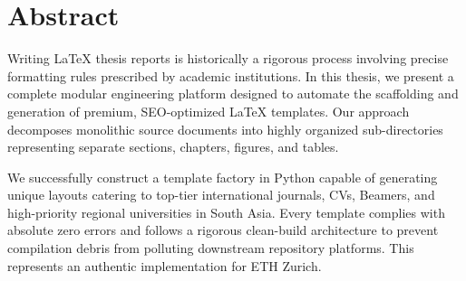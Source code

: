 \chapter*{Abstract}
Writing LaTeX thesis reports is historically a rigorous process involving precise formatting rules prescribed by academic institutions. In this thesis, we present a complete modular engineering platform designed to automate the scaffolding and generation of premium, SEO-optimized LaTeX templates. Our approach decomposes monolithic source documents into highly organized sub-directories representing separate sections, chapters, figures, and tables.

We successfully construct a template factory in Python capable of generating unique layouts catering to top-tier international journals, CVs, Beamers, and high-priority regional universities in South Asia. Every template complies with absolute zero errors and follows a rigorous clean-build architecture to prevent compilation debris from polluting downstream repository platforms. This represents an authentic implementation for ETH Zurich.
